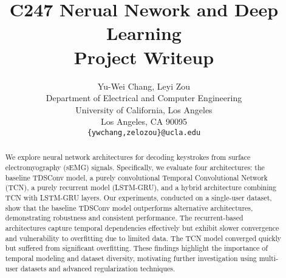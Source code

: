 \documentclass{article}
\title{C247 Nerual Nework and Deep Learning\\Project Writeup}
\author{%
  Yu-Wei Chang, Leyi Zou \\
  Department of Electrical and Computer Engineering\\
  University of California, Los Angeles\\
  Los Angeles, CA 90095 \\
  \texttt{\{ywchang,zelozou\}@ucla.edu} \\
}
\begin{document}
\maketitle


\begin{abstract}
    We explore neural network architectures for decoding keystrokes from surface electromyography (sEMG) signals. Specifically, we evaluate four architectures: the baseline TDSConv model, a purely convolutional Temporal Convolutional Network (TCN), a purely recurrent model (LSTM-GRU), and a hybrid architecture combining TCN with LSTM-GRU layers. Our experiments, conducted on a single-user dataset, show that the baseline TDSConv model outperforms alternative architectures, demonstrating robustness and consistent performance. The recurrent-based architectures capture temporal dependencies effectively but exhibit slower convergence and vulnerability to overfitting due to limited data. The TCN model converged quickly but suffered from significant overfitting. These findings highlight the importance of temporal modeling and dataset diversity, motivating further investigation using multi-user datasets and advanced regularization techniques.
\end{abstract}












% 
%
% 
\end{document}
